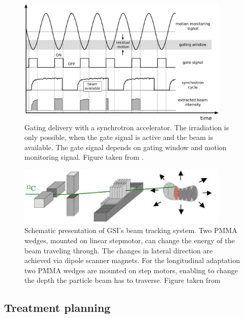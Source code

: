 \documentclass[type=dr, dr=rernat, accentcolor=tud7b,colorbacktitle, bigchapter, openright, twoside, 12pt ]{tudthesis}
\begin{document}
\begin{figure}[tbp]
  \centering
  \includegraphics[width=0.9\textwidth]{./Images/gatingscheme}
  \caption{Gating delivery with a synchrotron accelerator. The irradiation is only possible, when the gate signal is active and the beam is available. The gate signal
  depends on gating window and motion monitoring signal. Figure taken from \cite{Richter2012}.}
  \label{gating}
\end{figure}

\begin{figure}[H]
\begin{center}
\includegraphics[width=0.9\textwidth]{./Images/tracking.png}
\caption{Schematic presentation of GSI's beam tracking system. Two PMMA wedges, mounted on linear stepmotor, can change the energy of the beam traveling through. The changes in lateral direction are achieved via dipole scanner magnets. For the longitudinal adaptation two 
PMMA wedges are mounted on step motors, enabling to change the depth the particle beam has to traverse. Figure taken from \cite{Groezinger2004}}
\label{tracking}
\end{center}
\end{figure}

\subsection{Treatment planning}
\label{treatmentPlanning}
\end{document}
